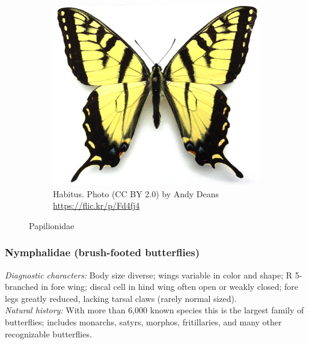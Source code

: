 \documentclass[letterpaper, 11pt]{article}
\begin{document}
\begin{figure}[ht!]
\begin{subfigure}[ht!]{0.5\textwidth}
        \includegraphics[width=\textwidth]{PapilionidHabitus}
        \caption{Habitus. Photo (CC BY 2.0) by Andy Deans \url{https://flic.kr/p/Fd4fj4}}
        \label{fig:papilionid2}
    \end{subfigure}
    \caption{Papilionidae}\label{fig:papilionids}
\end{figure}

\subsubsection{Nymphalidae (brush-footed butterflies)}
\noindent{}\textit{Diagnostic characters:} Body size diverse; wings variable in color and shape; R 5-branched in fore wing; discal cell in hind wing often open or weakly closed; fore legs greatly reduced, lacking tarsal claws (rarely normal sized).\\

\noindent{}\textit{Natural history:} With more than 6,000 known species this is the largest family of butterflies; includes monarchs, satyrs, morphos, fritillaries, and many other recognizable butterflies.
\end{document}
